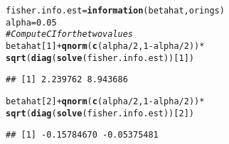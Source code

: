 \documentclass[15pt,a4paper]{article}\usepackage[]{graphicx}\usepackage[]{color}
\makeatletter
\newcommand{\hlnum}[1]{\textcolor[rgb]{0.686,0.059,0.569}{#1}}%
\newcommand{\hlcom}[1]{\textcolor[rgb]{0.678,0.584,0.686}{\textit{#1}}}%
\newcommand{\hlopt}[1]{\textcolor[rgb]{0,0,0}{#1}}%
\newcommand{\hlstd}[1]{\textcolor[rgb]{0.345,0.345,0.345}{#1}}%
\newcommand{\hlkwb}[1]{\textcolor[rgb]{0.69,0.353,0.396}{#1}}%
\newcommand{\hlkwd}[1]{\textcolor[rgb]{0.737,0.353,0.396}{\textbf{#1}}}%
\newenvironment{kframe}{%
 \def\at@end@of@kframe{}%
 \ifinner\ifhmode%
  \def\at@end@of@kframe{\end{minipage}}%
  \begin{minipage}{\columnwidth}%
 \fi\fi%
 \def\FrameCommand##1{\hskip\@totalleftmargin \hskip-\fboxsep
 \colorbox{shadecolor}{##1}\hskip-\fboxsep
     \hskip-\linewidth \hskip-\@totalleftmargin \hskip\columnwidth}%
 \MakeFramed {\advance\hsize-\width
   \@totalleftmargin\z@ \linewidth\hsize
   \@setminipage}}%
 {\par\unskip\endMakeFramed%
 \at@end@of@kframe}
\newenvironment{knitrout}{}{} %
\makeatother
\begin{document}
\begin{knitrout}
\begin{kframe}
\begin{alltt}
\hlstd{fisher.info.est} \hlkwb{=} \hlkwd{information}\hlstd{(betahat, orings)}
\hlstd{alpha} \hlkwb{=} \hlnum{0.05}
\hlcom{# Compute CI for the two values}
\hlstd{betahat[}\hlnum{1}\hlstd{]} \hlopt{+} \hlkwd{qnorm}\hlstd{(}\hlkwd{c}\hlstd{(alpha}\hlopt{/}\hlnum{2}\hlstd{,} \hlnum{1}\hlopt{-}\hlstd{alpha}\hlopt{/}\hlnum{2}\hlstd{))} \hlopt{*}
                   \hlkwd{sqrt}\hlstd{(}\hlkwd{diag}\hlstd{(}\hlkwd{solve}\hlstd{(fisher.info.est))[}\hlnum{1}\hlstd{])}
\end{alltt}
\begin{verbatim}
## [1] 2.239762 8.943686
\end{verbatim}
\begin{alltt}
\hlstd{betahat[}\hlnum{2}\hlstd{]} \hlopt{+} \hlkwd{qnorm}\hlstd{(}\hlkwd{c}\hlstd{(alpha}\hlopt{/}\hlnum{2}\hlstd{,} \hlnum{1}\hlopt{-}\hlstd{alpha}\hlopt{/}\hlnum{2}\hlstd{))} \hlopt{*}
                   \hlkwd{sqrt}\hlstd{(}\hlkwd{diag}\hlstd{(}\hlkwd{solve}\hlstd{(fisher.info.est))[}\hlnum{2}\hlstd{])}
\end{alltt}
\begin{verbatim}
## [1] -0.15784670 -0.05375481
\end{verbatim}
\end{kframe}
\end{knitrout}
\end{document}

